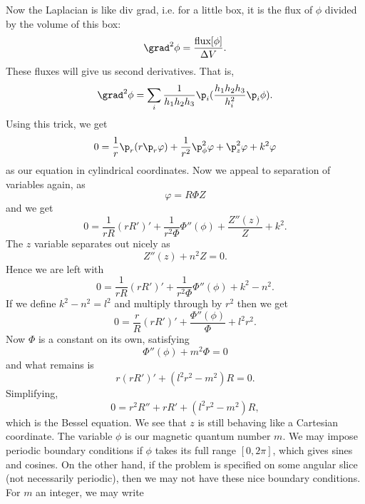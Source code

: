 Now the Laplacian is like div grad, i.e. for a little box, it is the flux of $\phi$ divided by the volume of this box:
\begin{equation}
    \grad^2 \phi = \frac{\text{flux}[\phi]}{\Delta V}.
\end{equation}
These fluxes will give us second derivatives. That is,
\begin{equation}
    \grad^2 \phi =\sum_i \frac{1}{h_1 h_2 h_3} \p_i (\frac{h_1 h_2 h_3}{h_i^2} \p_i \phi).
\end{equation}
Using this trick, we get
\begin{equation}
    0=\frac{1}{r} \p_r ( r \p_r \varphi) + \frac{1}{r^2} \p_\phi^2 \varphi + \p_z^2 \varphi + k^2 \varphi
\end{equation}
as our equation in cylindrical coordinates. Now we appeal to separation of variables again, as
\begin{equation}
    \varphi = R \Phi Z
\end{equation}
and we get
\begin{equation}
    0 = \frac{1}{rR}(rR')' + \frac{1}{r^2 \Phi} \Phi''(\phi) + \frac{Z''(z)}{Z} + k^2.
\end{equation}
The $z$ variable separates out nicely as
\begin{equation}
    Z''(z) + n^2 Z =0.
\end{equation} Hence we are left with
\begin{equation}
     0 = \frac{1}{rR}(rR')' +\frac{1}{r^2 \Phi} \Phi''(\phi) + k^2 -n^2.
\end{equation}
If we define $k^2 -n^2 = l^2$ and multiply through by $r^2$ then we get 
\begin{equation}
    0 = \frac{r}{R} (rR')' + \frac{\Phi''(\phi)}{\Phi} +l^2 r^2.
\end{equation}
Now $\Phi$ is a constant on its own, satisfying
\begin{equation}
    \Phi''(\phi) + m^2 \Phi =0
\end{equation}
and what remains is
\begin{equation}
    r(rR')' + (l^2 r^2 - m^2)R =0.
\end{equation}
Simplifying,
\begin{equation}
    0 = r^2 R'' + rR' + (l^2 r^2 -m^2)R,
\end{equation}
which is the Bessel equation. We see that $z$ is still behaving like a Cartesian coordinate. The variable $\phi$ is our magnetic quantum number $m$. We may impose periodic boundary conditions if $\phi$ takes its full range $[0,2\pi]$, which gives sines and cosines. On the other hand, if the problem is specified on some angular slice (not necessarily periodic), then we may not have these nice boundary conditions. For $m$ an integer, we may write
